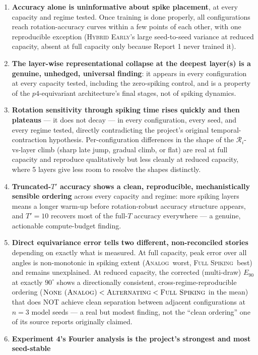 \documentclass[11pt]{article}
\newcommand{\Analog}{\textsc{Analog}}
\newcommand{\None}{\textsc{None (Analog)}}
\newcommand{\Alternating}{\textsc{Alternating}}
\newcommand{\FullSpiking}{\textsc{Full Spiking}}
\newcommand{\HybridEarly}{\textsc{Hybrid Early}}
\begin{document}
\begin{enumerate}[leftmargin=1.8em]
\item \textbf{Accuracy alone is uninformative about spike placement}, at every capacity and regime
tested. Once training is done properly, all configurations reach rotation-accuracy curves within a few
points of each other, with one reproducible exception (\HybridEarly's large seed-to-seed variance at
reduced capacity, absent at full capacity only because Report 1 never trained it).
\item \textbf{The layer-wise representational collapse at the deepest layer(s) is a genuine, unhedged,
universal finding}: it appears in every configuration at every capacity tested, including the
zero-spiking control, and is a property of the $p4$-equivariant architecture's final stages, not of
spiking dynamics.
\item \textbf{Rotation sensitivity through spiking time rises quickly and then plateaus} --- it does not
decay --- in every configuration, every seed, and every regime tested, directly contradicting the
project's original temporal-contraction hypothesis. Per-configuration differences in the shape of the
$\mathcal{R}_i$-vs-layer climb (sharp late jump, gradual climb, or flat) are real at full capacity and
reproduce qualitatively but less cleanly at reduced capacity, where 5 layers give less room to resolve
the shapes distinctly.
\item \textbf{Truncated-$T'$ accuracy shows a clean, reproducible, mechanistically sensible ordering}
across every capacity and regime: more spiking layers means a longer warm-up before rotation-robust
accuracy structure appears, and $T'{=}10$ recovers most of the full-$T$ accuracy everywhere --- a
genuine, actionable compute-budget finding.
\item \textbf{Direct equivariance error tells two different, non-reconciled stories} depending on
exactly what is measured. At full capacity, peak error over all angles is non-monotonic in spiking
extent (\Analog\ worst, \FullSpiking\ best) and remains unexplained. At reduced capacity, the corrected
(multi-draw) $E_{90}$ at exactly $90^\circ$ shows a directionally consistent, cross-regime-reproducible
ordering ($\None < \Alternating < \FullSpiking$ in the mean) that does NOT achieve clean separation
between adjacent configurations at $n{=}3$ model seeds --- a real but modest finding, not the ``clean
ordering'' one of its source reports originally claimed.
\item \textbf{Experiment 4's Fourier analysis is the project's strongest and most seed-stable
}
\end{enumerate}
\end{document}
